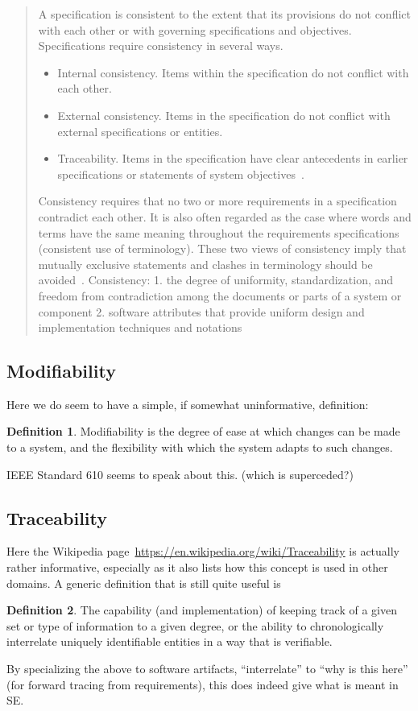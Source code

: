 \documentclass[letterpaper,cleveref]{lipics-v2019}
\theoremstyle{definition}
\newtheorem{defn}{Definition}
\begin{document}
\begin{quotation}
    A specification is consistent to the extent that its provisions do not conflict with each other or with governing specifications and objectives. Specifications require consistency in several ways.
    \begin{itemize}
        \item Internal consistency. Items within the specification do not conflict with each other.
        \item External consistency. Items in the specification do not conflict with external specifications or entities.
        \item Traceability. Items in the specification have clear antecedents in earlier specifications or statements of system objectives~\cite{Boehm1984}.
    \end{itemize}
    Consistency requires that no two or more requirements in a specification contradict each other. It is also often regarded as the case where words and terms have the same meaning throughout the requirements specifications (consistent use of terminology). These two views of consistency imply that mutually exclusive statements and clashes in terminology should be avoided~\cite{ZOWGHI2003}. Consistency: 1. the degree of uniformity, standardization, and freedom from contradiction among the documents or parts of a system or component 2. software attributes that provide uniform design and implementation techniques and notations~\cite{ISO/IEC/IEEE24765}
\end{quotation}

\subsection{Modifiability}

Here we do seem to have a simple, if somewhat uninformative, definition:

\begin{defn}
Modifiability is the degree of ease at which changes can be made to a system,
and the flexibility with which the system adapts to such changes.
\end{defn}

IEEE Standard 610 seems to speak about this. (which is superceded?)

\subsection{Traceability}

Here the Wikipedia page~\url{https://en.wikipedia.org/wiki/Traceability} is actually
rather informative, especially as it also lists how this concept is used in other domains.
A generic definition that is still quite useful is
\begin{defn}
The capability (and implementation) of keeping track of a given set or type of
information to a given degree, or the ability to chronologically interrelate
uniquely identifiable entities in a way that is verifiable.
\end{defn}
By specializing the above to software artifacts, ``interrelate'' to 
``why is this here'' (for forward tracing from requirements), this does
indeed give what is meant in SE.
\end{document}
